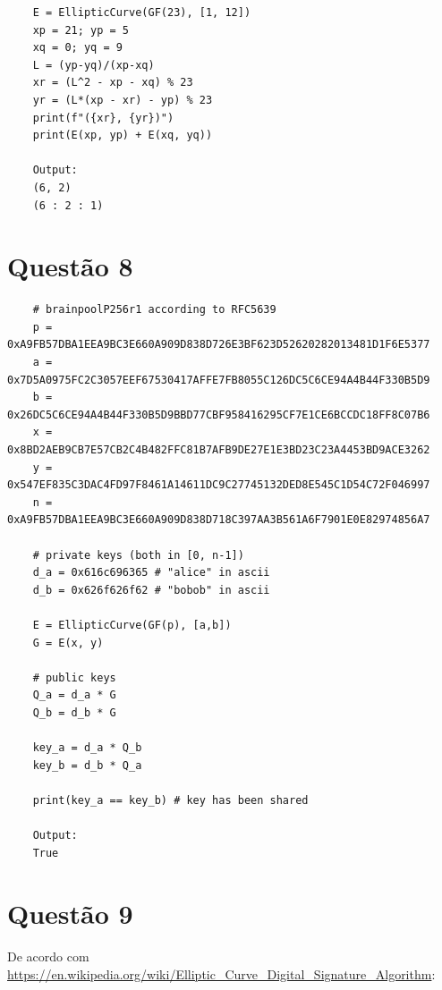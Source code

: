 \documentclass{article}
\begin{document}
\begin{verbatim}
    E = EllipticCurve(GF(23), [1, 12])
    xp = 21; yp = 5
    xq = 0; yq = 9
    L = (yp-yq)/(xp-xq)
    xr = (L^2 - xp - xq) % 23
    yr = (L*(xp - xr) - yp) % 23
    print(f"({xr}, {yr})")
    print(E(xp, yp) + E(xq, yq))
    
    Output:
    (6, 2)
    (6 : 2 : 1)
\end{verbatim}

\section*{Questão 8}

\begin{verbatim}
    # brainpoolP256r1 according to RFC5639
    p = 0xA9FB57DBA1EEA9BC3E660A909D838D726E3BF623D52620282013481D1F6E5377
    a = 0x7D5A0975FC2C3057EEF67530417AFFE7FB8055C126DC5C6CE94A4B44F330B5D9
    b = 0x26DC5C6CE94A4B44F330B5D9BBD77CBF958416295CF7E1CE6BCCDC18FF8C07B6
    x = 0x8BD2AEB9CB7E57CB2C4B482FFC81B7AFB9DE27E1E3BD23C23A4453BD9ACE3262
    y = 0x547EF835C3DAC4FD97F8461A14611DC9C27745132DED8E545C1D54C72F046997
    n = 0xA9FB57DBA1EEA9BC3E660A909D838D718C397AA3B561A6F7901E0E82974856A7

    # private keys (both in [0, n-1])
    d_a = 0x616c696365 # "alice" in ascii
    d_b = 0x626f626f62 # "bobob" in ascii

    E = EllipticCurve(GF(p), [a,b])
    G = E(x, y)

    # public keys
    Q_a = d_a * G
    Q_b = d_b * G

    key_a = d_a * Q_b
    key_b = d_b * Q_a

    print(key_a == key_b) # key has been shared

    Output:
    True
\end{verbatim}

\section*{Questão 9}

De acordo com \url{https://en.wikipedia.org/wiki/Elliptic_Curve_Digital_Signature_Algorithm}:
\end{document}

